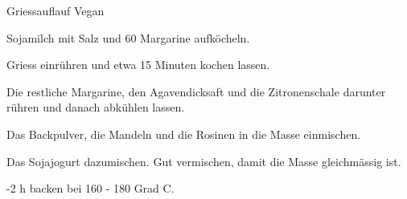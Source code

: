 
\begin{recipe}[]{Griessauflauf Vegan}{}{}



\step
Sojamilch mit Salz und 60 \g Margarine aufk\"ocheln.

\step
Griess einr\"uhren und etwa 15 Minuten kochen lassen.

\step
Die restliche Margarine, den Agavendicksaft und die Zitronenschale darunter r\"uhren und danach abk\"uhlen lassen.

\step
Das Backpulver, die Mandeln und die Rosinen in die Masse einmischen.

\step
Das Sojajogurt dazumischen. Gut vermischen, damit die Masse gleichm\"assig ist.

-2 h backen bei 160 - 180 Grad C.

\end{recipe}

